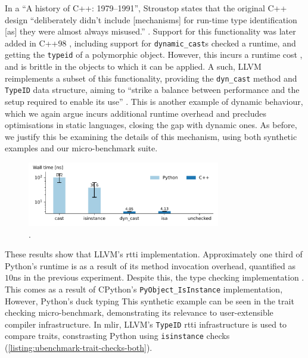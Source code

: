 In a ``A history of C++: 1979--1991'', Stroustop states that the original C++ design ``deliberately didn't include [mechanisms] for run-time type identification [as] they were almost always misused.'' \cite{stroustrupHistory197919911996}.
Support for this functionality was later added in C++98 \cite{internationalorganizationforstandardizationISOIEC148821998}, including support for \texttt{dynamic\_cast}s checked a runtime, and getting the \texttt{typeid} of a polymorphic object. However, this incurs a runtime cost \cite{goldthwaite2006technical}, and is brittle in the objects to which it can be applied. A such, LLVM reimplements a subset of this functionality, providing the \texttt{dyn\_cast} method and \texttt{TypeID} data structure, aiming to ``strike a balance between performance and the setup required to enable its use'' \cite{mlirteamMLIRCodeDocumentation}.
This is another example of dynamic behaviour, which we again argue incurs additional runtime overhead and precludes optimisations in static languages, closing the gap with dynamic ones.
As before, we justify this be examining the details of this mechanism, using both synthetic examples and our micro-benchmark suite.

\begin{figure}[H]
    \centering
    \includegraphics[width=0.75\textwidth]{images/impact_dynamism/dynamic_cast.pdf}
    \caption{.}
    \label{figure:impact-rtti}
\end{figure}

These results show that LLVM's \ac{rtti} implementation.
Approximately one third of Python's runtime is as a result of its method invocation overhead, quantified as $10$ns in the previous experiment. Despite this, the type checking implementation . This comes as a result of CPython's \texttt{PyObject\_IsInstance} implementation,
However, Python's duck typing
This synthetic example can be seen in the trait checking micro-benchmark, demonstrating its relevance to user-extensible compiler infrastructure. In \ac{mlir}, LLVM's \texttt{TypeID} \ac{rtti} infrastructure is used to compare traits, constrasting Python using \texttt{isinstance} checks (\autoref{listing:ubenchmark-trait-checks-both}).




